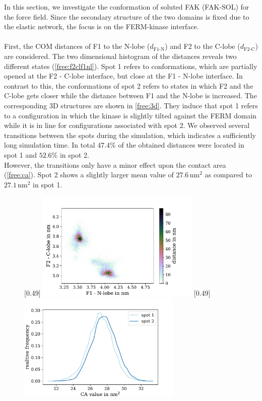 \label{sec:fak_sol}
In this section, we investigate the conformation of soluted FAK (FAK-SOL) for the \martini{} force field. Since the secondary structure of the two domains is fixed due to the elastic network, the focus is on the FERM-kinase interface.\\
\\
First, the COM distances of F1 to the N-lobe ($d_\text{F1-N}$) and F2 to the C-lobe ($d_\text{F2-C}$) are considered. The two dimensional histogram of the distances reveals two different states (\autoref{free:f2clf1nl}). Spot 1 refers to conformations, which are partially opened at the F2 - C-lobe interface, but close at the F1 - N-lobe interface. In contrast to this, the conformations of spot 2 refers to states in which F2 and the C-lobe gets closer while the distance between F1 and the N-lobe is increased. The corresponding 3D structures are shown in \autoref{free:3d}. They induce that spot 1 refers to a configuration in which the kinase is slightly tilted against the FERM domain while it is in line for configurations associated with spot 2. We observed several transitions between the spots during the simulation, which indicates a sufficiently long simulation time. In total $47.4\%$ of the obtained distances were located in spot 1 and $52.6\%$ in spot 2.\\
However, the transitions only have a minor effect upon the contact area (\autoref{free:ca}).  Spot 2 shows a slightly larger mean value of $27.6\,\si{\nano\metre}^2$ as compared to $27.1\,\si{\nano\metre}^2$ in spot 1.\\
%
%
%
\begin{figure}
	\subcaptionbox{\label{free:f2clf1nl}}[0.49\textwidth]{
		\includegraphics[height=5.2cm]{figures/results/free_f1f2}
	}\hfill%
	\subcaptionbox{\label{free:ca}}[0.49\textwidth]{
		\includegraphics[height=5.2cm]{figures/results/free_ca}
	}%
\end{figure}
